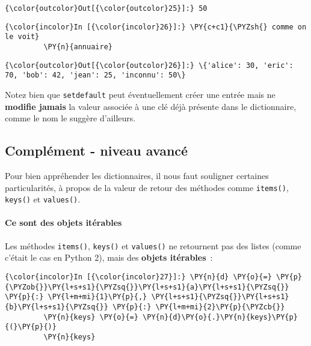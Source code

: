 \begin{Verbatim}[commandchars=\\\{\}]
{\color{outcolor}Out[{\color{outcolor}25}]:} 50
\end{Verbatim}
            
    \begin{Verbatim}[commandchars=\\\{\}]
{\color{incolor}In [{\color{incolor}26}]:} \PY{c+c1}{\PYZsh{} comme on le voit}
         \PY{n}{annuaire}
\end{Verbatim}


\begin{Verbatim}[commandchars=\\\{\}]
{\color{outcolor}Out[{\color{outcolor}26}]:} \{'alice': 30, 'eric': 70, 'bob': 42, 'jean': 25, 'inconnu': 50\}
\end{Verbatim}
            
    Notez bien que \texttt{setdefault} peut éventuellement créer une entrée
mais ne \textbf{modifie jamais} la valeur associée à une clé déjà
présente dans le dictionnaire, comme le nom le suggère d'ailleurs.

    \hypertarget{compluxe9ment---niveau-avancuxe9}{%
\subsection{Complément - niveau
avancé}\label{compluxe9ment---niveau-avancuxe9}}

    Pour bien appréhender les dictionnaires, il nous faut souligner
certaines particularités, à propos de la valeur de retour des méthodes
comme \texttt{items()}, \texttt{keys()} et \texttt{values()}.

    \hypertarget{ce-sont-des-objets-ituxe9rables}{%
\paragraph{Ce sont des objets
itérables}\label{ce-sont-des-objets-ituxe9rables}}

    Les méthodes \texttt{items()}, \texttt{keys()} et \texttt{values()} ne
retournent pas des listes (comme c'était le cas en Python 2), mais des
\textbf{objets itérables}~:

    \begin{Verbatim}[commandchars=\\\{\}]
{\color{incolor}In [{\color{incolor}27}]:} \PY{n}{d} \PY{o}{=} \PY{p}{\PYZob{}}\PY{l+s+s1}{\PYZsq{}}\PY{l+s+s1}{a}\PY{l+s+s1}{\PYZsq{}} \PY{p}{:} \PY{l+m+mi}{1}\PY{p}{,} \PY{l+s+s1}{\PYZsq{}}\PY{l+s+s1}{b}\PY{l+s+s1}{\PYZsq{}} \PY{p}{:} \PY{l+m+mi}{2}\PY{p}{\PYZcb{}}
         \PY{n}{keys} \PY{o}{=} \PY{n}{d}\PY{o}{.}\PY{n}{keys}\PY{p}{(}\PY{p}{)}
         \PY{n}{keys}
\end{Verbatim}


